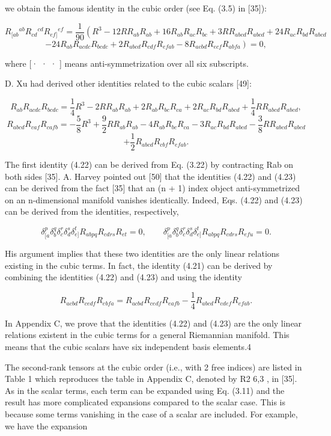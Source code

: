 \documentclass{article}
\begin{document}
we obtain the famous identity in the cubic order (see Eq. (3.5) in [35]):

$$R_{[ab}{}^{ab}R_{cd}{}^{cd}R_{ef]}{}^{ef}=\frac{1}{90}\left(R^{3}-12RR_{ab}R_{ab}+16R_{ab}R_{ac}R_{bc}+3RR_{abcd}R_{abcd}+24R_{ac}R_{bd}R_{abcd}\right.\tag{4.21}$$ $$\left.-24R_{ab}R_{acdc}R_{bcdc}+2R_{abcd}R_{cdf}R_{efab}-8R_{acbd}R_{ecf}R_{abfa}\right)=0,$$

where [· · · ] means anti-symmetrization over all six subscripts.

D. Xu had derived other identities related to the cubic scalars [49]:

$$R_{ab}R_{acdc}R_{bcdc}=\frac{1}{4}R^{3}-2RR_{ab}R_{ab}+2R_{ab}R_{bc}R_{ca}+2R_{ac}R_{bd}R_{abcd}+\frac{1}{4}RR_{abcd}R_{abcd},\tag{4.22}$$ $$R_{abcd}R_{caf}R_{cafb}=-\frac{5}{8}R^{3}+\frac{9}{2}RR_{ab}R_{ab}-4R_{ab}R_{bc}R_{ca}-3R_{ac}R_{bd}R_{abcd}-\frac{3}{8}RR_{abcd}R_{abcd}$$ $$+\frac{1}{2}R_{abcd}R_{cbf}R_{efab}.\tag{4.23}$$

The first identity (4.22) can be derived from Eq. (3.22) by contracting Rab on both sides [35]. A. Harvey pointed out [50] that the identities (4.22) and (4.23) can be derived from the fact [35] that an (n + 1) index object anti-symmetrized on an n-dimensional manifold vanishes identically. Indeed, Eqs. (4.22) and (4.23) can be derived from the identities, respectively,

$$\delta^{p}_{[a}\delta^{q}_{b}\delta^{r}_{c}\delta^{s}_{d}\delta^{t}_{e]}R_{abpq}R_{cdrs}R_{et}=0,\qquad\delta^{p}_{[a}\delta^{q}_{b}\delta^{r}_{c}\delta^{s}_{d}\delta^{t}_{e]}R_{abpq}R_{cdrs}R_{efu}=0.\tag{4.24}$$

His argument implies that these two identities are the only linear relations existing in the cubic terms. In fact, the identity (4.21) can be derived by combining the identities (4.22) and (4.23) and using the identity

$$R_{a c b d}R_{c e d f}R_{e b f a}=R_{a c b d}R_{c e d f}R_{e a f b}-\frac{1}{4}R_{a b c d}R_{c d e f}R_{e f a b}.$$

In Appendix C, we prove that the identities (4.22) and (4.23) are the only linear relations existent in the cubic terms for a general Riemannian manifold. This means that the cubic scalars have six independent basis elements.4

The second-rank tensors at the cubic order (i.e., with 2 free indices) are listed in Table 1 which reproduces the table in Appendix C, denoted by R2 6,3 , in [35]. As in the scalar terms, each term can be expanded using Eq. (3.11) and the result has more complicated expansions compared to the scalar case. This is because some terms vanishing in the case of a scalar are included. For example, we have the expansion
\end{document}
